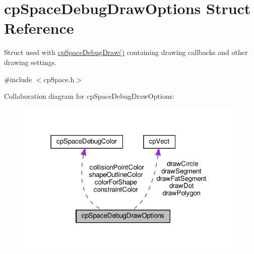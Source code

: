 \hypertarget{structcpSpaceDebugDrawOptions}{}\section{cp\+Space\+Debug\+Draw\+Options Struct Reference}
\label{structcpSpaceDebugDrawOptions}


Struct used with \hyperlink{group__cpSpace_ga02e8a34681aff3f29bd976e830f3b6da}{cp\+Space\+Debug\+Draw()} containing drawing callbacks and other drawing settings.  




{\ttfamily \#include $<$cp\+Space.\+h$>$}



Collaboration diagram for cp\+Space\+Debug\+Draw\+Options\+:
\nopagebreak
\begin{figure}[H]
\begin{center}
\leavevmode
\includegraphics[width=313pt]{structcpSpaceDebugDrawOptions__coll__graph}
\end{center}
\end{figure}
